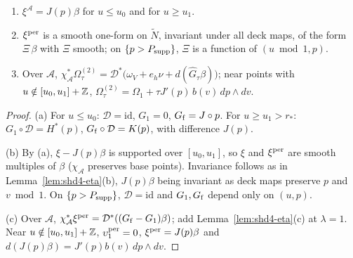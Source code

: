 \begin{lemma}\label{lem:shd4-xi}
\begin{enumerate}[label=(\alph*)]
\item $\xi^{\mathcal A}=J(p)\beta$ for $u\le u_0$ and for $u\ge u_1$.
\item $\xi^{\rm per}$ is a smooth one-form on $\widetilde N$, invariant under all deck maps, of the form $\Xi\,\beta$ with $\Xi$ smooth; on
$\{p>P_{\rm supp}\}$, $\Xi$ is a function of $(u\bmod1,p)$.
\item Over $\mathcal A$, $\chi_{\mathcal A}^*\Omega^{(2)}_\tau=\mathcal D^*\bigl(\omega_V+e_h\nu+d(\hat G_\tau\beta)\bigr)$; near points with
$u\notin[u_0,u_1]+\mathbb{Z}$, $\Omega^{(2)}_\tau=\Omega_1+\tau J'(p)\,b(v)\,dp\wedge dv$.
\end{enumerate}
\end{lemma}

\begin{proof}
(a) For $u\le u_0$: $\mathcal D=\mathrm{id}$, $G_1=0$, $G_{\rm f}=J\circ p$. For $u\ge u_1>r_*$: $G_1\circ\mathcal D=H^*(p)$, $G_{\rm f}\circ\mathcal D=K(p)$, with difference $J(p)$.

(b) By (a), $\xi-J(p)\beta$ is supported over $[u_0,u_1]$, so $\xi$ and $\xi^{\rm per}$ are smooth multiples of $\beta$ ($\chi_{\mathcal A}$ preserves base points). Invariance follows as in Lemma~\ref{lem:shd4-eta}(b), $J(p)\beta$ being invariant as deck maps preserve $p$ and $v\bmod1$. On $\{p>P_{\rm supp}\}$, $\mathcal D=\mathrm{id}$ and $G_1,G_{\rm f}$ depend only on $(u,p)$.

(c) Over $\mathcal A$, $\chi_{\mathcal A}^*\xi^{\rm per}=\mathcal D^*((G_{\rm f}-G_1)\beta)$; add Lemma~\ref{lem:shd4-eta}(c) at $\lambda=1$. Near $u\notin[u_0,u_1]+\mathbb{Z}$, $\upsilon^{\rm per}_1=0$, $\xi^{\rm per}=J(p)\beta$ and $d(J(p)\beta)=J'(p)b(v)\,dp\wedge dv$.
\end{proof}

